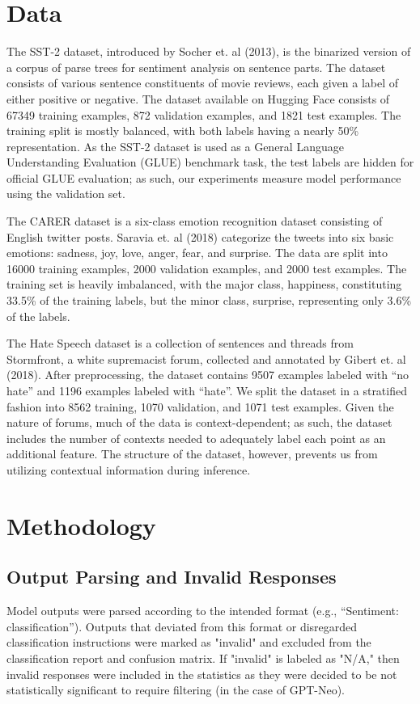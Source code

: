\documentclass[twocolumn]{article}
\begin{document}
\section{Data}

The SST-2 dataset, introduced by Socher et. al (2013), is the binarized version of a corpus of parse trees for sentiment analysis on sentence parts. The dataset consists of various sentence constituents of movie reviews, each given a label of either positive or negative. The dataset available on Hugging Face consists of 67349 training examples, 872 validation examples, and 1821 test examples. The training split is mostly balanced, with both labels having a nearly 50\% representation. As the SST-2 dataset is used as a General Language Understanding Evaluation (GLUE) benchmark task, the test labels are hidden for official GLUE evaluation; as such, our experiments measure model performance using the validation set.

The CARER dataset is a six-class emotion recognition dataset consisting of English twitter posts. Saravia et. al (2018) categorize the tweets into six basic emotions: sadness, joy, love, anger, fear, and surprise. The data are split into 16000 training examples, 2000 validation examples, and 2000 test examples. The training set is heavily imbalanced, with the major class, happiness, constituting 33.5\% of the training labels, but the minor class, surprise, representing only 3.6\% of the labels.

The Hate Speech dataset is a collection of sentences and threads from Stormfront, a white supremacist forum, collected and annotated by Gibert et. al (2018). After preprocessing, the dataset contains 9507 examples labeled with “no hate” and 1196 examples labeled with “hate”. We split the dataset in a stratified fashion into 8562 training, 1070 validation, and 1071 test examples. Given the nature of forums, much of the data is context-dependent; as such, the dataset includes the number of contexts needed to adequately label each point as an additional feature. The structure of the dataset, however, prevents us from utilizing contextual information during inference.

\section{Methodology}

\subsection{Output Parsing and Invalid Responses}
Model outputs were parsed according to the intended format (e.g., “Sentiment: {classification}”). Outputs that deviated from this format or disregarded classification instructions were marked as "invalid" and excluded from the classification report and confusion matrix. If "invalid" is labeled as "N/A," then invalid responses were included in the statistics as they were decided to be not statistically significant to require filtering (in the case of GPT-Neo).
\end{document}
